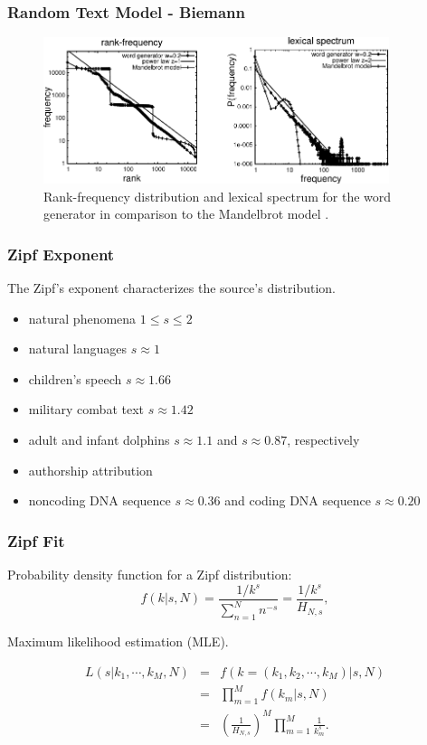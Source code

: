 \documentclass{beamer}
\begin{document}
\frame
{
  \frametitle{Random Text Model - Biemann}
    \begin{figure}[h!]
    \centering
    \includegraphics[width=0.9\textwidth]{imagespresentation/biemann.pdf}
    \caption{Rank-frequency distribution and lexical spectrum for the word generator in comparison to the Mandelbrot model \citep{biemann2007}.}
    \label{fig:biemann}
    \end{figure}
}




\frame
{
  \frametitle{Zipf Exponent}

  The Zipf's exponent characterizes the source's distribution.

  \begin{itemize}
  \item natural phenomena $1 \leq s \leq 2$ \citep{baek2011}
  \item natural languages $s \approx 1$ \citep{piotrovskii}
  \item children's speech $s \approx 1.66$ \citep{piotrovskii}
  \item military combat text $s \approx 1.42$ \citep{kolguskin1960}
  \item adult and infant dolphins $s \approx 1.1$ and $s \approx 0.87$, respectively \citep{mccowan1999}
  \item authorship attribution \citep{havlin1995}
  \item noncoding DNA sequence $s \approx 0.36$ and coding DNA sequence $s \approx 0.20$ \citep{mantegna1994}
  \end{itemize}
}

\frame
{
  \frametitle{Zipf Fit}
Probability density function for a Zipf distribution:
\begin{equation}
\label{eq:zipf_relation}
f(k | s, N) = \frac{1/k^s}{\sum_{n=1}^{N} n^{-s}} = \frac{1/k^s}{H_{N,s}} ,
\end{equation} 

Maximum likelihood estimation (MLE).

\begin{eqnarray}
L(s|k_1,\cdots,k_M,N) &=& f(k=(k_1, k_2, \cdots, k_M) | s, N) \nonumber \\ 
                      &=& \prod_{m=1}^{M} f(k_m | s, N) \nonumber \\
                      &=& \left( \frac{1}{H_{N,s}} \right)^M \prod_{m=1}^{M} \frac{1}{k_m^s} .
\end{eqnarray}

}
\end{document}
